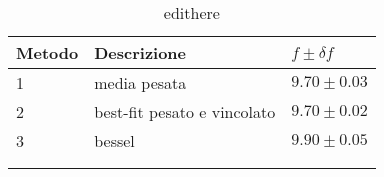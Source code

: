 \begin{longtable}{@{}lll@{}}
\toprule
Metodo & Descrizione & $f \pm \delta f$ \tabularnewline
\midrule
1 & media pesata & $9.70 \pm 0.03$ \tabularnewline
2 & best-fit pesato e vincolato & $9.70 \pm 0.02$ \tabularnewline
3 & bessel & $9.90 \pm 0.05$ \tabularnewline
\bottomrule
\label{tab:edithere}
\\
\caption{edithere}
\end{longtable}
